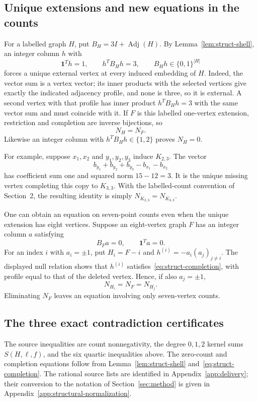 \documentclass[11pt]{article}
\theoremstyle{remark}
\numberwithin{equation}{section}
\begin{document}
\subsection{Unique extensions and new equations in the counts}
\label{subsec:struct-completions}
For a labelled graph $H$, put $B_H=3I+\operatorname{Adj}(H)$.
By Lemma~\ref{lem:struct-shell}, an integer column $h$ with
\begin{equation}\label{eq:struct-completion}
 \mathbf1^Th=1,\qquad h^TB_Hh=3,\qquad
 B_Hh\in\{0,1\}^{|H|}
\end{equation}
forces a unique external vertex at every induced embedding of $H$.
Indeed, the vector sum is a vertex vector; its inner products with
the selected vertices give exactly the indicated adjacency profile,
and none is three, so it is external.  A second vertex with that
profile has inner product $h^TB_Hh=3$ with the same vector sum
and must coincide with it.  If $F$ is this labelled one-vertex
extension, restriction and completion are inverse bijections, so
\begin{equation}\label{eq:struct-bijection}
 N_H=N_F.
\end{equation}
Likewise an integer column with $h^TB_Hh\in\{1,2\}$ proves
$N_H=0$.

For example, suppose $x_1,x_2$ and $y_1,y_2,y_3$ induce
$K_{2,3}$.  The vector
\[
 b_{y_1}+b_{y_2}+b_{y_3}-b_{x_1}-b_{x_2}
\]
has coefficient sum one and squared norm $15-12=3$.
It is the unique missing vertex completing this copy to $K_{3,3}$.
With the labelled-count convention of Section~2, the resulting
identity is simply $N_{K_{2,3}}=N_{K_{3,3}}$.

One can obtain an equation on seven-point counts even when the
unique extension has eight vertices.  Suppose an eight-vertex
graph $F$ has an integer column $a$ satisfying
\[
 B_Fa=0,\qquad \mathbf1^Ta=0.
\]
For an index $i$ with $a_i=\pm1$, put $H_i=F-i$ and
$h^{(i)}=-a_i(a_j)_{j\ne i}$.  The displayed null relation shows
that $h^{(i)}$ satisfies~\eqref{eq:struct-completion}, with
profile equal to that of the deleted vertex.  Hence, if also
$a_j=\pm1$,
\begin{equation}\label{eq:struct-cards}
 N_{H_i}=N_F=N_{H_j}.
\end{equation}
Eliminating $N_F$ leaves an equation involving only seven-vertex counts.

\subsection{The three exact contradiction certificates}
\label{subsec:struct-certificates}
The source inequalities are count nonnegativity, the degree $0,1,2$
kernel sums $S(H,\ell,f)$, and the six quartic inequalities above.
The zero-count and completion equations follow from
Lemma~\ref{lem:struct-shell} and~\eqref{eq:struct-completion}.
The rational source lists are identified in Appendix~\ref{app:delivery}; their conversion
to the notation of Section~\ref{sec:method} is given in
Appendix~\ref{app:structural-normalization}.
\end{document}
